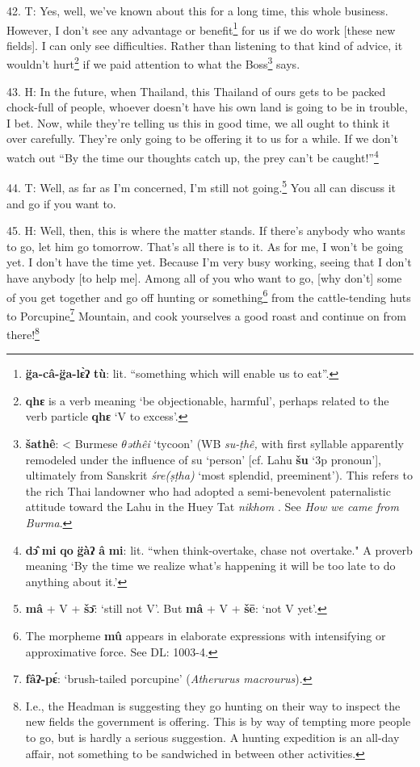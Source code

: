 42. T: Yes, well, we've known about this for a long time, this whole business.
However, I don't see any advantage or benefit\footnote{\textbf{g̈a-câ-g̈a-lɛ̀ʔ} \textbf{tù}: lit. ``something which will enable us to eat''.} for us if we do work [these new
fields]. I can only see difficulties. Rather than listening to that kind of advice,
it wouldn't hurt\footnote{\textbf{qhɛ} is a verb meaning `be objectionable, harmful', perhaps related to the verb particle \textbf{qhɛ} `V to excess'.} if we paid attention to what the Boss\footnote{\textbf{šathê}: < Burmese \textit{$\theta$əthêi } `tycoon' (WB \textit{su-ṭhê, }with first syllable apparently remodeled under the influence of su `person' [cf. Lahu \textbf{šu} `3p pronoun'], ultimately from Sanskrit \textit{śre(ṣṭha) } `most splendid, preeminent'). This refers to the rich Thai landowner who had adopted a semi-benevolent paternalistic attitude toward the Lahu in the Huey Tat \textit{nikhom }. See \textit{How we came from Burma}.} says.

43. H: In the future, when Thailand, this Thailand of ours gets to be packed chock-full
of people, whoever doesn't have his own land is going to be in trouble, I bet.
Now, while they're telling us this in good time, we all ought to think it over
carefully. They're only going to be offering it to us for a while. If we don't
watch out ``By the time our thoughts catch up, the prey can't be caught!''\footnote{\textbf{dɔ̂} \textbf{mi} \textbf{qo} \textbf{g̈àʔ} \textbf{â} \textbf{mi}: lit. ``when think-overtake, chase not overtake." A proverb meaning `By the time we realize what's happening it will be too late to do anything about it.'}

44. T: Well, as far as I'm concerned, I'm still not going.\footnote{\textbf{mâ} + V + \textbf{šɔ̄}: `still not V'. But \textbf{mâ} + V + \textbf{šē}: `not V yet'.} You all can
discuss it and go if you want to.

45. H: Well, then, this is where the matter stands. If there's anybody who wants
to go, let him go tomorrow. That's all there is to it. As for me, I won't be going
yet. I don't have the time yet. Because I'm very busy working, seeing that I don't
have anybody [to help me]. Among all of you who want to go, [why don't] some of
you get together and go off hunting or something\footnote{The morpheme \textbf{mû} appears in elaborate expressions with intensifying or approximative force. See DL: 1003-4.} from the cattle-tending huts
to Porcupine\footnote{\textbf{fâʔ-pɛ́}: `brush-tailed porcupine' (\textit{Atherurus macrourus}).} Mountain, and cook yourselves a good roast and continue on from
there!\footnote{I.e., the Headman is suggesting they go hunting on their way to inspect the new fields the government is offering. This is by way of tempting more people to go, but is hardly a serious suggestion. A hunting expedition is an all-day affair, not something to be sandwiched in between other activities.}

